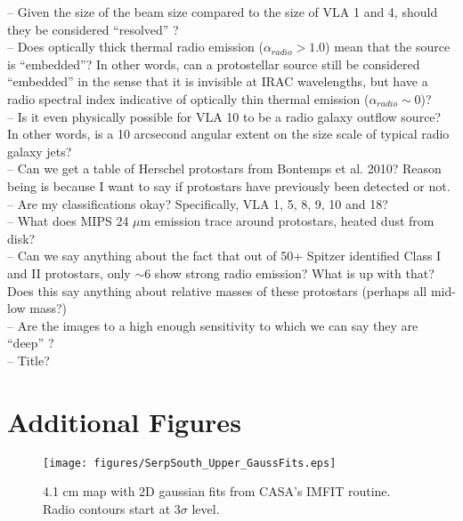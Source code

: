 \documentclass[apj]{emulateapj}
\begin{document}
-- Given the size of the beam size compared to the size of VLA 1 and 4, should they be considered ``resolved'' ? \\

-- Does optically thick thermal radio emission ($\alpha_{radio} > 1.0$) mean that the source is ``embedded''? In other words, can a protostellar source still be considered ``embedded'' in the sense that it is invisible at IRAC wavelengths, but have a radio spectral index indicative of optically thin thermal emission ($\alpha_{radio} \sim0$)?\\

-- Is it even physically possible for VLA 10 to be a radio galaxy outflow source? In other words, is a 10 arcsecond angular extent on the size scale of typical radio galaxy jets? \\

-- Can we get a table of Herschel protostars from Bontemps et al. 2010? Reason being is because I want to say if protostars have previously been detected or not.\\

-- Are my classifications okay? Specifically, VLA 1, 5, 8, 9, 10 and 18? \\

-- What does MIPS 24 $\mu$m emission trace around protostars, heated dust from disk?\\

-- Can we say anything about the fact that out of 50+ Spitzer identified Class I and II protostars, only $\sim$6 show strong radio emission? What is up with that? Does this say anything about relative masses of these protostars (perhaps all mid-low mass?) \\

-- Are the images to a high enough sensitivity to which we can say they are ``deep'' ? \\

-- Title? \\


\newpage
\section{Additional Figures}

\begin{figure}[h!]
\label{fig:serpsouth_upper_gaussfits}
\centering
\texttt{[image: figures/SerpSouth\_Upper\_GaussFits.eps]}
\caption{\small{4.1 cm map with 2D gaussian fits from CASA's IMFIT routine. Radio contours start at 3$\sigma$ level.
}}
\end{figure}
\end{document}
